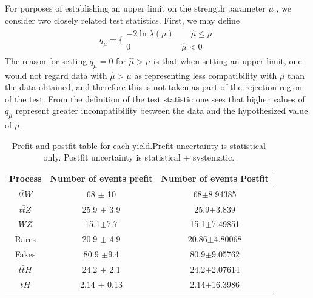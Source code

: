 For purposes of establishing an upper limit on the strength parameter $\mu$ , we consider two
closely related test statistics. First, we may define
\begin{align} 
q_{\mu}=  \Big\{    \begin{array}{ll}
-2\ln\lambda(\mu) \qquad \hat{\mu} \leq \mu	\\
0  \qquad \qquad \qquad \hat{\mu}< 0 
\end{array}
\end{align}
The reason for setting $q_\mu = 0$
for $\hat{\mu}>\mu $ is that when setting an upper limit, one would not regard data with $\hat{\mu}>\mu $ as
representing less compatibility with $\mu$ than the data obtained, and therefore this is not taken
as part of the rejection region of the test. From the definition of the test statistic one sees that
higher values of $q_\mu$ represent greater incompatibility between the data and the hypothesized
value of $\mu$.







\begin{table}
	\caption{Prefit and postfit table for each yield.Prefit uncertainty is statistical only. Postfit uncertainty is statistical + systematic.}
\begin{tabular}{ccc}
	\hline
	Process  & Number of events prefit    & Number of events Postfit \\
	\hline
$t\bar{t}W$  &  68 $\pm$ 10 & 68$\pm$8.94385\\
	$t\bar{t}Z$  & 25.9 $\pm$ 3.9 & 25.9$\pm$3.839\\
$WZ$ & 15.1$\pm$7.7 & 15.1$\pm$7.49851\\
Rares & 20.9 $\pm$   4.9& 20.86$\pm$4.80068\\
	Fakes  & 80.9 $\pm$9.4  & 80.9$\pm$9.05762\\
$t\bar{t}H$  &  24.2 $\pm$ 2.1 & 24.2$\pm$2.07614\\
\hline
$tH$ & 2.14 $\pm$ 0.13  & 2.14$\pm$16.3986
\end{tabular}	
\end{table}


